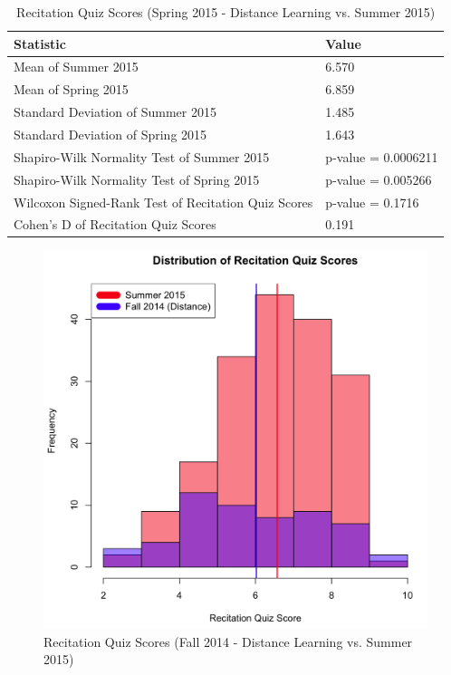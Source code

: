 \pagebreak\clearpage

\begin{small}
\begin{table}
  \centering
  \begin{tabular}{|l|l|}
    \hline
    \textbf{Statistic} & \textbf{Value} \\
	\hline
	Mean of Summer 2015 & 6.570 \\
	\hline
	Mean of Spring 2015 & 6.859 \\
	\hline
	Standard Deviation of Summer 2015 & 1.485 \\
	\hline
	Standard Deviation of Spring 2015 & 1.643 \\
	\hline
	Shapiro-Wilk Normality Test of Summer 2015 & p-value = 0.0006211 \\
	\hline
	Shapiro-Wilk Normality Test of Spring 2015 & p-value = 0.005266 \\
	\hline
	Wilcoxon Signed-Rank Test of Recitation Quiz Scores & p-value = 0.1716 \\
	\hline
	Cohen's D of Recitation Quiz Scores & 0.191 \\
	\hline
  \end{tabular}
	\caption{Recitation Quiz Scores (Spring 2015 - Distance Learning vs. Summer 2015)}
  \label{tab:rqSp15dSu15}
\end{table}
\end{small}

\pagebreak\clearpage

\begin{figure}
	\centering
	\includegraphics[width=5in]{img/chapter4/rq_su15_vs_f14d}
	\caption[Recitation Quiz Scores (Fall 2014 - Distance Learning vs. Summer 2015)]{Recitation Quiz Scores (Fall 2014 - Distance Learning vs. Summer 2015)}
  \label{fig:rqf14dSu15}
\end{figure}

